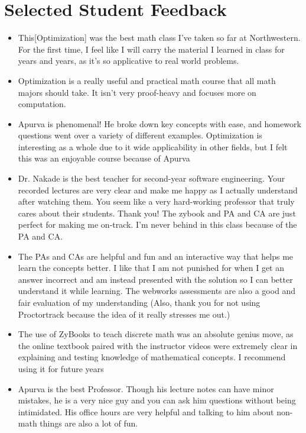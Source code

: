 \documentclass[10pt]{amsbook}
\begin{document}
  \newpage 
  \section*{Selected Student Feedback}
  \begin{itemize}
    \item This[Optimization] was the best math class I've taken so far at Northwestern. For the first time, I feel like I will carry the material I learned in class
    for years and years, as it's so applicative to real world problems. 
    \item Optimization is a really useful and practical math course that all math majors should take. It isn't very proof-heavy and focuses
    more on computation.    
    \item Apurva is phenomenal! He broke down key concepts with ease, and homework questions went over a variety of different examples.
    Optimization is interesting as a whole due to it wide applicability in other fields, but I felt this was an enjoyable course because of
    Apurva
    \item Dr. Nakade is the best teacher for second-year software engineering. Your recorded lectures are very clear and make me happy as I
    actually understand after watching them. You seem like a very hard-working professor that truly cares about their students. Thank you!
    The zybook and PA and CA are just perfect for making me on-track. I'm never behind in this class because of the PA and CA.
    \item The PAs and CAs are helpful and
    fun and an interactive way that helps me learn the concepts better. I like that I am not punished for when I get an answer incorrect and
    am instead presented with the solution so I can better understand it while learning. The webworks assessments are also a good and
    fair evaluation of my understanding 
    (Also, thank you for not using Proctortrack because the idea of it really stresses me out.)
    \item The use of ZyBooks to teach discrete math was an absolute genius move, as the online textbook paired with the instructor videos were
    extremely clear in explaining and testing knowledge of mathematical concepts. I recommend using it for future years
    \item Apurva is the best Professor. Though his lecture notes can have minor mistakes, he is a very nice guy and you can ask him
    questions without being intimidated. His office hours are very helpful and talking to him about non-math things are also a lot of fun.

\end{itemize}
\end{document}
